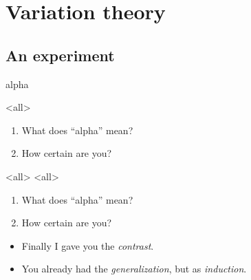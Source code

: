\section{Variation theory}

\subsection{An experiment}

\begin{frame}
  \begin{center}
    \huge
    alpha
  \end{center}
\end{frame}

\mode<all>{}

\begin{frame}
  \begin{question}
    \begin{enumerate}
      \item What does \enquote{alpha} mean?
      \item How certain are you?
    \end{enumerate}
  \end{question}
\end{frame}

\mode<all>{}
\mode<all>{}

\begin{frame}
  \begin{question}[Again]
    \begin{enumerate}
      \item What does \enquote{alpha} mean?
      \item How certain are you?
    \end{enumerate}
  \end{question}
\end{frame}

\begin{frame}
  \begin{remark}
    \begin{itemize}
      \item Finally I gave you the \emph{contrast}.
      \item You already had the \emph{generalization}, but as \emph{induction}.
    \end{itemize}
  \end{remark}
\end{frame}

